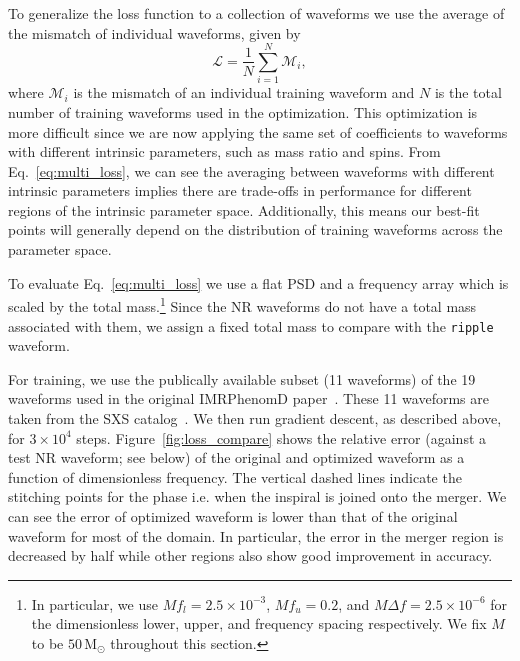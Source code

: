 \documentclass[twocolumn]{aastex631}
\newcommand{\ripple}{\texttt{ripple}\xspace}
\newcommand{\amc}[1]{{\color{red}[AC: #1]}}
\begin{document}
To generalize the loss function to a collection of waveforms we use the average of the mismatch of individual waveforms, given by
\begin{equation}
	\mathcal{L}=\frac{1}{N}\sum_{i=1}^{N}\mathcal{M}_i,
    \label{eq:multi_loss}
\end{equation}
where $\mathcal{M}_i$ is the mismatch of an individual training waveform and $N$ is the total number of training waveforms used in the optimization.
This optimization is more difficult since we are now applying the same set of coefficients to waveforms with different intrinsic parameters, such as mass ratio and spins. 
From Eq.~\ref{eq:multi_loss}, we can see the averaging between waveforms with different intrinsic parameters implies there are trade-offs in performance for different regions of the intrinsic parameter space. 
Additionally, this means our best-fit points will generally depend on the distribution of training waveforms across the parameter space.

To evaluate Eq.~\ref{eq:multi_loss} we use a flat PSD and a frequency array which is scaled by the total mass.\footnote{
    In particular, we use $M f_l = 2.5 \times 10^{-3}$, $M f_u = 0.2$, and $M\Delta f = 2.5 \times 10^{-6}$ for the dimensionless lower, upper, and frequency spacing respectively. We fix $M$ to be $50\,\mathrm{M}_\odot$ throughout this section.
}
Since the NR waveforms do not have a total mass associated with them, we assign a fixed total mass to compare with the \ripple waveform.

For training, we use the publically available subset (11 waveforms) of the 19 waveforms used in the original IMRPhenomD paper~\citep{Khan:2015jqa}. 
These 11 waveforms are taken from the SXS catalog~\citep{Boyle:2019kee}.
We then run gradient descent, as described above, for $3\times 10^4$ steps. 
Figure~\ref{fig:loss_compare} shows the relative error (against a test NR waveform; see below) of the original and optimized waveform as a function of dimensionless frequency.
The vertical dashed lines indicate the stitching points for the phase i.e. when the inspiral is joined onto the merger.
We can see the error of optimized waveform is lower than that of the original waveform for most of the domain.
In particular, the error in the merger region is decreased by half while other regions also show good improvement in accuracy. 
\end{document}
